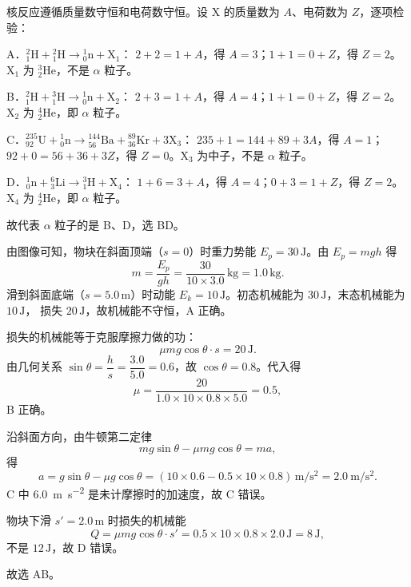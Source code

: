 \begin{answer}
核反应遵循质量数守恒和电荷数守恒。设 $\mathrm{X}$ 的质量数为 $A$、电荷数为 $Z$，逐项检验：

A．${}_{1}^{2}\mathrm{H}+{}_{1}^{2}\mathrm{H}\to{}_{0}^{1}\mathrm{n}+\mathrm{X}_1$：
$2+2=1+A$，得 $A=3$；$1+1=0+Z$，得 $Z=2$。$\mathrm{X}_1$ 为 ${}_{2}^{3}\mathrm{He}$，不是 $\alpha$ 粒子。

B．${}_{1}^{2}\mathrm{H}+{}_{1}^{3}\mathrm{H}\to{}_{0}^{1}\mathrm{n}+\mathrm{X}_2$：
$2+3=1+A$，得 $A=4$；$1+1=0+Z$，得 $Z=2$。$\mathrm{X}_2$ 为 ${}_{2}^{4}\mathrm{He}$，即 $\alpha$ 粒子。

C．${}_{92}^{235}\mathrm{U}+{}_{0}^{1}\mathrm{n}\to{}_{56}^{144}\mathrm{Ba}+{}_{36}^{89}\mathrm{Kr}+3\mathrm{X}_3$：
$235+1=144+89+3A$，得 $A=1$；$92+0=56+36+3Z$，得 $Z=0$。$\mathrm{X}_3$ 为中子，不是 $\alpha$ 粒子。

D．${}_{0}^{1}\mathrm{n}+{}_{3}^{6}\mathrm{Li}\to{}_{1}^{3}\mathrm{H}+\mathrm{X}_4$：
$1+6=3+A$，得 $A=4$；$0+3=1+Z$，得 $Z=2$。$\mathrm{X}_4$ 为 ${}_{2}^{4}\mathrm{He}$，即 $\alpha$ 粒子。

故代表 $\alpha$ 粒子的是 B、D，选 BD。
\end{answer}

\begin{answer}
由图像可知，物块在斜面顶端（$s=0$）时重力势能 $E_p=30\,\mathrm{J}$。由 $E_p=mgh$ 得
\[
  m=\frac{E_p}{gh}=\frac{30}{10\times3.0}\,\si{\kilogram}=1.0\,\si{\kilogram}.
\]
滑到斜面底端（$s=5.0\,\mathrm{m}$）时动能 $E_k=10\,\mathrm{J}$。初态机械能为 $30\,\mathrm{J}$，末态机械能为 $10\,\mathrm{J}$，
损失 $20\,\mathrm{J}$，故机械能不守恒，A 正确。

损失的机械能等于克服摩擦力做的功：
\[
  \mu mg\cos\theta\cdot s=20\,\mathrm{J}.
\]
由几何关系 $\sin\theta=\dfrac{h}{s}=\dfrac{3.0}{5.0}=0.6$，故 $\cos\theta=0.8$。代入得
\[
  \mu=\frac{20}{1.0\times10\times0.8\times5.0}=0.5,
\]
B 正确。

沿斜面方向，由牛顿第二定律
\[
  mg\sin\theta-\mu mg\cos\theta=ma,
\]
得
\[
  a=g\sin\theta-\mu g\cos\theta
   =(10\times0.6-0.5\times10\times0.8)\,\si{\metre\per\second\squared}
   =\SI{2.0}{\metre\per\second\squared}.
\]
C 中 \SI{6.0}{\metre\per\second\squared} 是未计摩擦时的加速度，故 C 错误。

物块下滑 $s'=2.0\,\mathrm{m}$ 时损失的机械能
\[
  Q=\mu mg\cos\theta\cdot s'
   =0.5\times10\times0.8\times2.0\,\mathrm{J}
   =8\,\mathrm{J},
\]
不是 $12\,\mathrm{J}$，故 D 错误。

故选 AB。
\end{answer}

